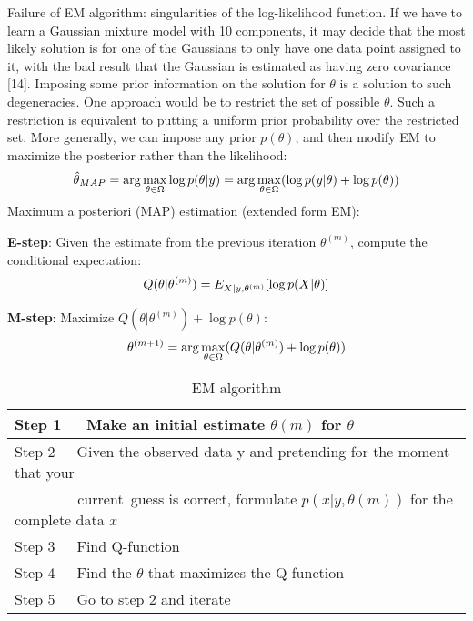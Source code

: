 \documentclass[onecolumn,12pt]{IEEEtran}
\begin{document}
Failure of EM algorithm: singularities of the log-likelihood function. If we have to learn a Gaussian mixture model with 10 components, it may decide that the most likely solution is for one of the Gaussians to only have one data point assigned to it, with the bad result that the Gaussian is estimated as having zero covariance [14]. Imposing some prior information on the solution for $\theta$ is a solution to such degeneracies. One approach would be to restrict the set of possible $\theta$. Such a restriction is equivalent to putting a uniform prior probability over the restricted set. More generally, we can impose any prior $p(\theta)$, and then modify EM to maximize the posterior rather than the likelihood:
\begin{equation}
  \hat{\theta}_{MAP} = \arg\max_{\theta \in \Omega} \log p(\theta|y) = \arg\max_{\theta \in \Omega} (\log p(y|\theta) + \log p(\theta)) \\
\end{equation}
Maximum a posteriori (MAP) estimation (extended form EM):

\textbf{E-step}: Given the estimate from the previous iteration $\theta^{(m)}$, compute the conditional expectation:
\begin{equation}
  Q(\theta|\theta^{(m)}) = E_{X|y,\theta^{(m)}}[\log p(X|\theta)] \\
\end{equation}

\textbf{M-step}: Maximize $Q(\theta|\theta^{(m)}) + \log p(\theta)$:
\begin{equation}
  \theta^{(m+1)} = \arg\max_{\theta \in \Omega}(Q(\theta|\theta^{(m)})+ \log p(\theta)) \\
\end{equation}

\begin{table}[]
  \centering
  \caption{EM algorithm}
  \begin{tabular}{l} 
    \hline
    Step 1 ~ Make an initial estimate $\theta(m)$ for $\theta$ \\ \hline
    Step 2 ~ Given the observed data y and pretending for the moment that your\\
    ~~~~~~~~ current guess is correct, formulate $p(x|y,\theta(m))$ for the complete data $x$ \\ \hline
    Step 3 ~ Find Q-function \\ \hline
    Step 4 ~ Find the $\theta$ that maximizes the Q-function \\ \hline
    Step 5 ~ Go to step 2 and iterate \\ \hline
  \end{tabular}
\end{table}
\end{document}
